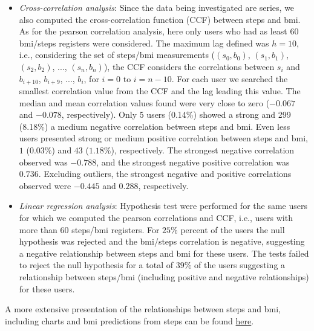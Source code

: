 \documentclass[11pt]{iopart}
\begin{document}
\begin{itemize}
\begin{itemize}
\item \textit{Cross-correlation analysis}: Since the data being investigated are series, we also computed the cross-correlation function (CCF) between steps and bmi. 
As for the pearson correlation analysis, here only users who had as least 60 bmi/steps registers were considered.
The maximum lag defined was $h=10$, i.e., considering the set of steps/bmi measurements ($(s_0, b_0)$, $(s_1, b_1)$, $(s_2, b_2)$, ...,  $(s_n, b_n)$), the CCF considers the correlations between $s_{i}$ and $b_{i+10}$, $b_{i+9}$, ..., $b_{i}$, for $i=0$ to $i=n-10$.
For each user we searched the smallest correlation value from the CCF and the lag leading this value.
The median  and mean correlation values found were very close to zero  
($-0.067$ and $-0.078$, respectively). Only 5 users (0.14\%) showed a strong and 299 (8.18\%) a medium negative correlation between steps and bmi.
Even less users presented strong or medium positive correlation between steps and bmi, $1$ ($0.03\%$) and $43$ ($1.18\%$), respectively.
The strongest negative correlation observed was $-0.788$, and the strongest negative positive correlation was $0.736$. 
Excluding outliers, the strongest negative and positive correlations observed were $-0.445$ and $0.288$, respectively.


\item \textit{Linear regression analysis}: 
Hypothesis test were performed for the same users for which we computed the pearson correlations and CCF, i.e., users with more than 60 steps/bmi registers.
For $25\%$ percent of the users the null hypothesis was rejected and the bmi/steps correlation is negative, suggesting a negative relationship between steps and bmi for these users. 
The tests failed to reject  the null hypothesis for a total of $39\%$ of the users suggesting a relationship between steps/bmi (including positive and negative relationships) for these users.

\end{itemize}
\end{itemize}

A more extensive presentation of the relationships between steps and bmi, including charts and bmi predictions from steps can be found \href{http://htmlpreview.github.io/?https://github.com/renatalucia/activity-tracker/blob/master/data_exploration/bmi_steps_correlation.html}{here}.
\end{document}
